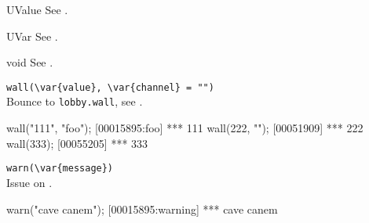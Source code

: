 \begin{urbiscriptapi}
\item[UValue] See .

\item[UVar] See .
\item[void] See .
\item \lstinline|wall(\var{value}, \var{channel} = "")|\\
  Bounce to \lstinline|lobby.wall|, see .
\begin{urbiscript}
wall("111", "foo");
[00015895:foo] *** 111
wall(222, "");
[00051909] *** 222
wall(333);
[00055205] *** 333
\end{urbiscript}

\item \lstinline|warn(\var{message})|\\
  Issue  on .
\begin{urbiscript}
warn("cave canem");
[00015895:warning] *** cave canem
\end{urbiscript}

\end{urbiscriptapi}

